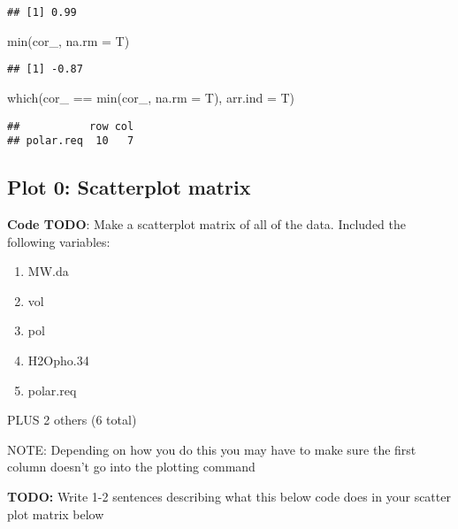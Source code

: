 \documentclass[
]{book}
\newenvironment{Shaded}{\begin{snugshade}}{\end{snugshade}}
\newcommand{\AttributeTok}[1]{\textcolor[rgb]{0.77,0.63,0.00}{#1}}
\newcommand{\FunctionTok}[1]{\textcolor[rgb]{0.00,0.00,0.00}{#1}}
\newcommand{\NormalTok}[1]{#1}
\newcommand{\SpecialCharTok}[1]{\textcolor[rgb]{0.00,0.00,0.00}{#1}}
\providecommand{\tightlist}{%
  \setlength{\itemsep}{0pt}\setlength{\parskip}{0pt}}
\begin{document}
\begin{verbatim}
## [1] 0.99
\end{verbatim}

\begin{Shaded}
\begin{Highlighting}[]
\FunctionTok{min}\NormalTok{(cor\_, }\AttributeTok{na.rm =}\NormalTok{ T)}
\end{Highlighting}
\end{Shaded}

\begin{verbatim}
## [1] -0.87
\end{verbatim}

\begin{Shaded}
\begin{Highlighting}[]
\FunctionTok{which}\NormalTok{(cor\_ }\SpecialCharTok{==} \FunctionTok{min}\NormalTok{(cor\_, }\AttributeTok{na.rm =}\NormalTok{ T), }\AttributeTok{arr.ind =}\NormalTok{ T)}
\end{Highlighting}
\end{Shaded}

\begin{verbatim}
##           row col
## polar.req  10   7
\end{verbatim}

\hypertarget{plot-0-scatterplot-matrix-1}{%
\subsection{Plot 0: Scatterplot matrix}\label{plot-0-scatterplot-matrix-1}}

\textbf{Code TODO}: Make a scatterplot matrix of all of the data. Included the following variables:

\begin{enumerate}
\def\labelenumi{\arabic{enumi}.}
\tightlist
\item
  MW.da
\item
  vol
\item
  pol
\item
  H2Opho.34
\item
  polar.req
\end{enumerate}

PLUS 2 others (6 total)

NOTE: Depending on how you do this you may have to make sure the first column doesn't go into the plotting command

\textbf{TODO:} Write 1-2 sentences describing what this below code does in your scatter plot matrix below
\end{document}
